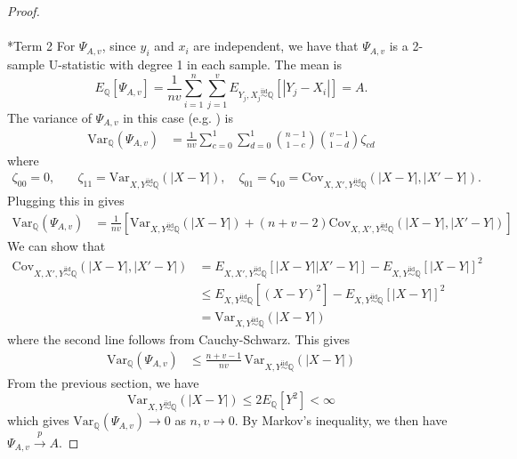 \documentclass[11pt,a4paper]{article}
\makeatletter
\let\oldparagraph\paragraph
\renewcommand{\paragraph}{
    \@ifstar
      \xxxParagraphStar
      \xxxParagraphNoStar
  }
\newcommand{\xxxParagraphStar}[1]{\oldparagraph*{#1}\mbox{}}
\newcommand{\xxxParagraphNoStar}[1]{\oldparagraph{#1}\mbox{}}
\newcommand{\iid}{\overset{\mathrm{iid}}{\sim}}
\theoremstyle{plain}
\theoremstyle{remark}
\theoremstyle{remark}
\makeatother
\begin{document}
\begin{proof}
\paragraph*{Term 2} For $\Psi_{A,v}$, since \( y_i \) and \(x_i\) are independent, we have that $\Psi_{A,v}$ is a 2-sample U-statistic with degree 1 in each sample. The mean is 
  \[
  E_{\mathbb{Q}}[\Psi_{A,v}] = \frac{1}{nv} \sum_{i = 1}^n \sum_{j = 1}^v E_{Y_j,X_j \iid\mathbb{Q}}\left[|Y_j - X_i|\right] = A.
  \]
  The variance of $\Psi_{A,v}$ in this case (e.g. \citet[Theorem 12.6]{van2000}) is 
\begin{align*}
\text{Var}_{\mathbb{Q}}(\Psi_{A,v}) &= 
\frac{1}{nv} \sum_{c = 0}^1 \sum_{d = 0}^1 {{n-1}\choose {1 - c}}  {{v - 1} \choose {1 - d}} \zeta_{cd}
\end{align*}
where
\begin{align*}
    \zeta_{00} =0, &\quad  \zeta_{11}= \text{Var}_{X,Y \iid \mathbb{Q}}\left(|X - Y|\right), \quad \zeta_{01} = \zeta_{10} = \text{Cov}_{{X,X',Y \iid \mathbb{Q}}}\left(|X - Y|, |X' - Y|\right).
\end{align*}
Plugging this in gives
\begin{align*}
    \text{Var}_{\mathbb{Q}}(\Psi_{A,v}) &= \frac{1}{nv}\left[\text{Var}_{X,Y \iid \mathbb{Q}}\left(|X - Y|\right) + (n + v-2)  \text{Cov}_{{X,X',Y \iid \mathbb{Q}}}\left(|X - Y|, |X' - Y|\right)\right]
\end{align*}
We can show that
\begin{align*}
    \text{Cov}_{{X,X',Y \iid \mathbb{Q}}}\left(|X - Y|, |X' - Y|\right) &= E_{{X,X',Y \iid \mathbb{Q}}}\left[|X - Y||X' - Y|\right] - E_{X,Y \iid \mathbb{Q}}\left[|X - Y|\right]^2\\
    &\leq E_{{X,Y \iid \mathbb{Q}}}\left[(X - Y)^2\right]- E_{X,Y \iid \mathbb{Q}}\left[|X - Y|\right]^2\\
    &= \text{Var}_{X,Y \iid \mathbb{Q}}\left(|X - Y|\right)
\end{align*}
where the second line follows from Cauchy-Schwarz. This gives
\begin{align*}
    \text{Var}_{\mathbb{Q}}(\Psi_{A,v}) &\leq \frac{n+v-1}{nv}\, \text{Var}_{X,Y \iid \mathbb{Q}}\left(|X - Y|\right) 
\end{align*}
From the previous section, we have
$$
\text{Var}_{X,Y \iid \mathbb{Q}}\left(|X - Y|\right) \leq 2E_{\mathbb{Q}}[Y^2]< \infty
$$ 
which gives  $\text{Var}_{\mathbb{Q}}(\Psi_{A,v})\to0$ as $n,v \to 0$. By Markov's inequality, we then have $\Psi_{A,v}\overset{p}{\to}A$. 


\end{proof}
\end{document}
